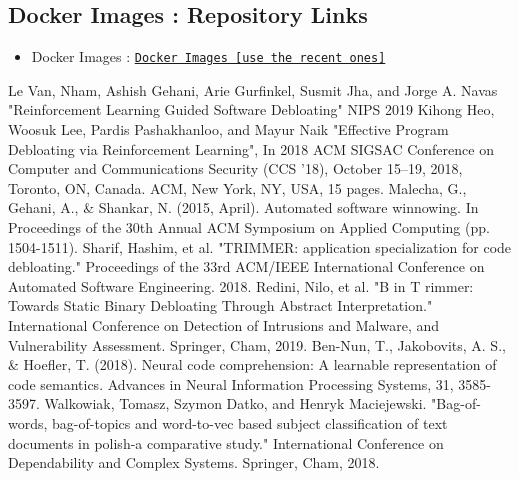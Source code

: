 \documentclass{relatorio}
\begin{document}
\subsection{Docker Images : Repository Links}%
\begin{itemize}
	\item Docker Images : \texttt{\href{https://hub.docker.com/u/prodrelworks} {Docker Images [use the recent ones]}}
\end{itemize}


\nocite{*}
\begin{thebibliography}{9}
	Le Van, Nham, Ashish Gehani, Arie Gurfinkel, Susmit Jha, and Jorge A. Navas
	"Reinforcement Learning Guided Software Debloating"
	NIPS 2019
	Kihong Heo, Woosuk Lee, Pardis Pashakhanloo, and Mayur Naik
	"Effective Program Debloating via Reinforcement Learning", In 2018 ACM
	SIGSAC Conference on Computer and Communications Security (CCS ’18), October
	15–19, 2018, Toronto, ON, Canada. ACM, New York, NY, USA, 15 pages.
	Malecha, G., Gehani, A., \& Shankar, N. (2015, April). Automated software winnowing. In Proceedings of the 30th Annual ACM Symposium on Applied Computing (pp. 1504-1511).
	Sharif, Hashim, et al. "TRIMMER: application specialization for code debloating." Proceedings of the 33rd ACM/IEEE International Conference on Automated Software Engineering. 2018.
	Redini, Nilo, et al. "B in T rimmer: Towards Static Binary Debloating Through Abstract Interpretation." International Conference on Detection of Intrusions and Malware, and Vulnerability Assessment. Springer, Cham, 2019.
	Ben-Nun, T., Jakobovits, A. S., \& Hoefler, T. (2018). Neural code comprehension: A learnable representation of code semantics. Advances in Neural Information Processing Systems, 31, 3585-3597.
	Walkowiak, Tomasz, Szymon Datko, and Henryk Maciejewski. "Bag-of-words, bag-of-topics and word-to-vec based subject classification of text documents in polish-a comparative study." International Conference on Dependability and Complex Systems. Springer, Cham, 2018.
\end{thebibliography}
\end{document}

